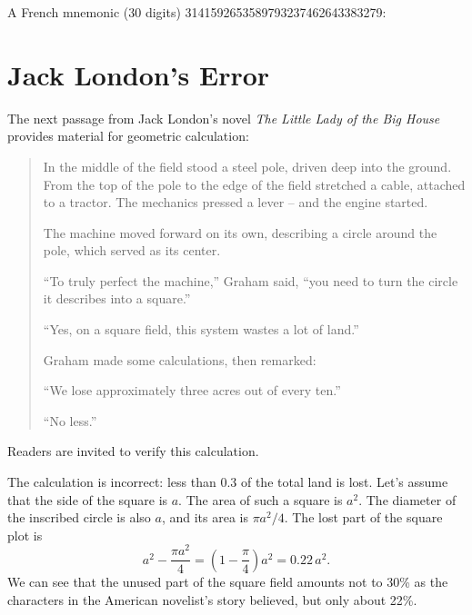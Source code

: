 A French mnemonic (30 digits) \num{3 1 4 1 5 9 2 6 5 3 5 8 9 7 9 3 2 3 7 4 6 2 6 4 3 3 8 3 2 7 9}:

\begin{small}
\end{small}

\clearpage
\section{Jack London's Error}
\label{sec-9.3}

The next passage from Jack London's novel \emph{The Little Lady of the Big House} provides material for geometric calculation:
\begin{quote}
In the middle of the field stood a steel pole, driven deep into the ground. From the top of the pole to the edge of the field stretched a cable, attached to a tractor. The mechanics pressed a lever -- and the engine started.

The machine moved forward on its own, describing a circle around the pole, which served as its center.

``To truly perfect the machine,'' Graham said, ``you need to turn the circle it describes into a square.''

``Yes, on a square field, this system wastes a lot of land.''

Graham made some calculations, then remarked:

``We lose approximately three acres out of every ten.''

``No less.''
\end{quote}

Readers are invited to verify this calculation.

\ans The calculation is incorrect: less than 0.3 of the total land is lost. Let's assume that the side of the square is $a$. The area of such a square is $a^{2}$. The diameter of the inscribed circle is also $a$, and its area is $\pi a^{2}/4$. The lost part of the square plot is
\begin{equation*}%
a^{2} - \frac{\pi a^2}{4} = \left(1 - \frac{\pi}{4} \right) a^{2}= 0.22 \, a^{2}.
\end{equation*}
We can see that the unused part of the square field amounts not to 30\% as the characters in the American novelist's story believed, but only about 22\%.


